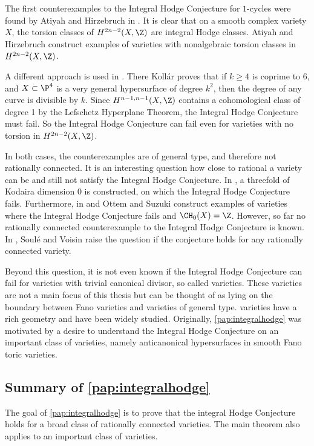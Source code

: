 The first counterexamples to the Integral Hodge Conjecture for $1$-cycles were found by Atiyah and Hirzebruch in \cite{AtiyahHirzebruch}. It is clear that on a smooth complex variety $X$, the torsion classes of $H^{2n-2}(X,\Z)$ are integral Hodge classes.  Atiyah and Hirzebruch construct examples of varieties with nonalgebraic torsion classes in $H^{2n-2}(X,\Z)$.

A different approach is used in \cite{KollarTrento}. There Koll\'ar proves that if $k\geq 4$ is coprime to 6, and $X \subset \P^4$ is a very general hypersurface of degree $k^2$, then the degree of any curve is divisible by $k$. Since $H^{n-1,n-1}(X,\Z)$ contains a cohomological class of degree 1 by the Lefschetz Hyperplane Theorem, the Integral Hodge Conjecture must fail. So the Integral Hodge Conjecture can fail even for varieties with no torsion in $H^{2n-2}(X,\Z)$.

In both cases, the counterexamples are of general type, and therefore not rationally connected.  It is an interesting question how close to rational a variety can be and still not satisfy the Integral Hodge Conjecture. In \cite{BenoistOttemIntegralHodge}, a threefold of Kodaira dimension 0 is constructed, on which the Integral Hodge Conjecture fails. Furthermore, in \cite{OttemSuzukiPencil} and \cite{OttemSuzukiAcyclic} Ottem and Suzuki construct examples of varieties where the Integral Hodge Conjecture fails and $\CH_0(X) = \Z$. However, so far no rationally connected counterexample to the Integral Hodge Conjecture is known. In \cite{SouleVoisin}, Soulé and Voisin raise the question if the conjecture holds for any rationally connected variety.

Beyond this question, it is not even known if the Integral Hodge Conjecture can fail for varieties with trivial canonical divisor, so called \CY varieties. These varieties are not a main focus of this thesis but can be thought of as lying on the boundary between Fano varieties and varieties of general type. \CY varieties have a rich geometry and have been widely studied. Originally, \cref{pap:integralhodge} was motivated by a desire to understand the Integral Hodge Conjecture on an important class of \CY varieties, namely anticanonical hypersurfaces in smooth Fano toric varieties.

\subsection{Summary of \cref{pap:integralhodge}}
The goal of \cref{pap:integralhodge} is to prove that the integral Hodge Conjecture holds for a broad class of rationally connected varieties. The main theorem also applies to an important class of \CY varieties.

